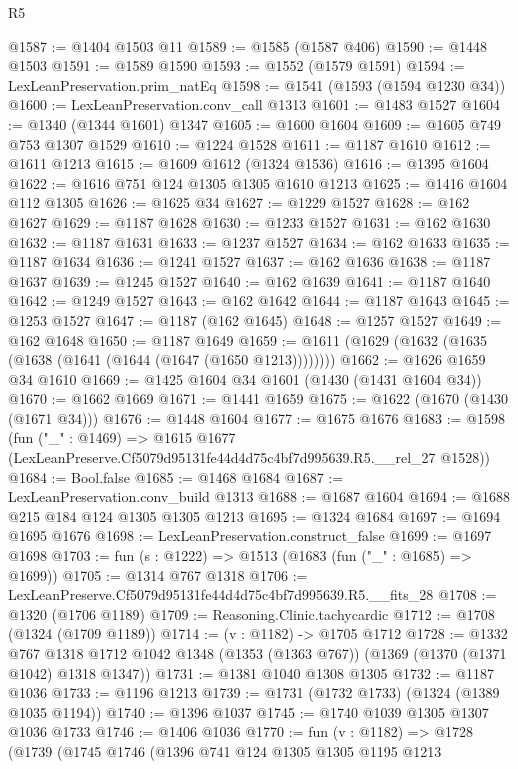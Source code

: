 \begin{lexlean}{R5}
\begin{coremodule}
@1587 := @1404 @1503 @11
@1589 := @1585 (@1587 @406)
@1590 := @1448 @1503
@1591 := @1589 @1590
@1593 := @1552 (@1579 @1591)
@1594 := LexLeanPreservation.prim_natEq
@1598 := @1541 (@1593 (@1594 @1230 @34))
@1600 := LexLeanPreservation.conv_call @1313
@1601 := @1483 @1527
@1604 := @1340 (@1344 @1601) @1347
@1605 := @1600 @1604
@1609 := @1605 @749 @753 @1307 @1529
@1610 := @1224 @1528
@1611 := @1187 @1610
@1612 := @1611 @1213
@1615 := @1609 @1612 (@1324 @1536)
@1616 := @1395 @1604
@1622 := @1616 @751 @124 @1305 @1305 @1610 @1213
@1625 := @1416 @1604 @112 @1305
@1626 := @1625 @34
@1627 := @1229 @1527
@1628 := @162 @1627
@1629 := @1187 @1628
@1630 := @1233 @1527
@1631 := @162 @1630
@1632 := @1187 @1631
@1633 := @1237 @1527
@1634 := @162 @1633
@1635 := @1187 @1634
@1636 := @1241 @1527
@1637 := @162 @1636
@1638 := @1187 @1637
@1639 := @1245 @1527
@1640 := @162 @1639
@1641 := @1187 @1640
@1642 := @1249 @1527
@1643 := @162 @1642
@1644 := @1187 @1643
@1645 := @1253 @1527
@1647 := @1187 (@162 @1645)
@1648 := @1257 @1527
@1649 := @162 @1648
@1650 := @1187 @1649
@1659 := @1611 (@1629 (@1632 (@1635 (@1638 (@1641 (@1644 (@1647 (@1650 @1213))))))))
@1662 := @1626 @1659 @34 @1610
@1669 := @1425 @1604 @34 @1601 (@1430 (@1431 @1604 @34))
@1670 := @1662 @1669
@1671 := @1441 @1659
@1675 := @1622 (@1670 (@1430 (@1671 @34)))
@1676 := @1448 @1604
@1677 := @1675 @1676
@1683 := @1598
    (fun ("_" : @1469) =>
    @1615 @1677 (LexLeanPreserve.Cf5079d95131fe44d4d75c4bf7d995639.R5.__rel_27 @1528))
@1684 := Bool.false
@1685 := @1468 @1684
@1687 := LexLeanPreservation.conv_build @1313
@1688 := @1687 @1604
@1694 := @1688 @215 @184 @124 @1305 @1305 @1213
@1695 := @1324 @1684
@1697 := @1694 @1695 @1676
@1698 := LexLeanPreservation.construct_false
@1699 := @1697 @1698
@1703 := fun (s : @1222) => @1513 (@1683 (fun ("_" : @1685) => @1699))
@1705 := @1314 @767 @1318
@1706 := LexLeanPreserve.Cf5079d95131fe44d4d75c4bf7d995639.R5.__fits_28
@1708 := @1320 (@1706 @1189)
@1709 := Reasoning.Clinic.tachycardic
@1712 := @1708 (@1324 (@1709 @1189))
@1714 := (v : @1182) -> @1705 @1712
@1728 := @1332
    @767
    @1318
    @1712
    @1042
    @1348
    (@1353 (@1363 @767))
    (@1369 (@1370 (@1371 @1042) @1318 @1347))
@1731 := @1381 @1040 @1308 @1305
@1732 := @1187 @1036
@1733 := @1196 @1213
@1739 := @1731 (@1732 @1733) (@1324 (@1389 @1035 @1194))
@1740 := @1396 @1037
@1745 := @1740 @1039 @1305 @1307 @1036 @1733
@1746 := @1406 @1036
@1770 := fun (v : @1182) =>
  @1728
    (@1739
      (@1745
        @1746
        (@1396
          @741
          @124
          @1305
          @1305
          @1195
          @1213

\end{coremodule}
\end{lexlean}
